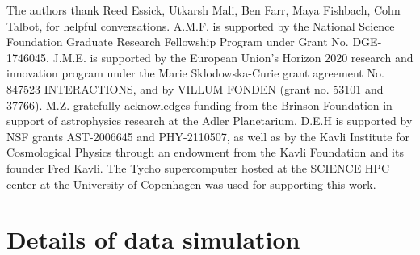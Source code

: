\documentclass[]{aastex631}
\begin{document}
\begin{acknowledgments}
    The authors thank Reed Essick, Utkarsh Mali, Ben Farr, Maya Fishbach, Colm Talbot,  for helpful conversations. 
    A.M.F. is supported by the National Science Foundation Graduate Research Fellowship Program under Grant No. DGE-1746045.
    J.M.E. is supported by the European Union’s Horizon 2020 research and innovation program under the Marie Sklodowska-Curie grant agreement No. 847523 INTERACTIONS, and by VILLUM FONDEN (grant no. 53101 and 37766). 
    M.Z. gratefully acknowledges funding from the Brinson Foundation in support of astrophysics research at the Adler Planetarium.
    D.E.H is supported by NSF grants AST-2006645 and PHY-2110507, as well as by the Kavli Institute for Cosmological Physics through an endowment from the Kavli Foundation and its founder Fred Kavli.
    The Tycho supercomputer hosted at the SCIENCE HPC center at the University of Copenhagen was used for supporting this work.
\end{acknowledgments}



\appendix
\section{Details of data simulation}
\label{ap:data generation}
\end{document}
